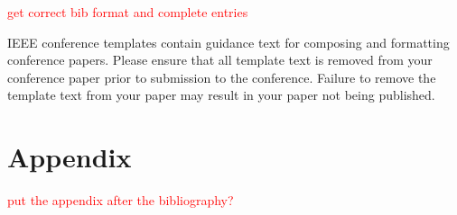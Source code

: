 \documentclass[conference]{IEEEtran}
\begin{document}
\textcolor{red}{get correct bib format and complete entries}






\color{red}
\vspace{12pt}
IEEE conference templates contain guidance text for composing and formatting conference papers. Please ensure that all template text is removed from your conference paper prior to submission to the conference. Failure to remove the template text from your paper may result in your paper not being published.





\section{Appendix}
\textcolor{red}{put the appendix after the bibliography?}
\end{document}
